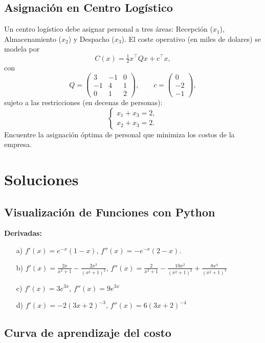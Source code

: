 \documentclass[12pt]{article}
\begin{document}
\subsection{Asignación en Centro Logístico}

Un centro logístico debe asignar personal a tres áreas: Recepción (\(x_1\)), Almacenamiento (\(x_2\)) y Despacho (\(x_3\)). El coste operativo (en miles de dolares) se modela por
\[
C(x)=\tfrac12 x^\top Q x + c^\top x,
\]
con
\[
Q=\begin{pmatrix}3&-1&0\\[4pt]-1&4&1\\[4pt]0&1&2\end{pmatrix},\qquad
c=\begin{pmatrix}0\\[4pt]-2\\[4pt]-1\end{pmatrix},
\]
sujeto a las restricciones (en decenas de personas):
\[
\begin{cases}
x_1+x_3=2,\\[4pt]
x_2+x_3=2.
\end{cases}
\]
Encuentre la asignación óptima de personal que minimiza los costos de la empresa.

\newpage

\section{Soluciones}

\subsection{Visualización de Funciones con Python}

\textbf{Derivadas:}
\begin{itemize}
    \item[a)] $f'(x) = e^{-x} (1-x)$, $f''(x) = -e^{-x} (2-x)$. 
    \item[b)] $f'(x) = \frac{2 x}{x^2+1}-\frac{2 x^3}{\left(x^2+1\right)^2}$, $f''(x) = \frac{2}{x^2 +1} - \frac{10x^2}{(x^2+1)^2} + \frac{8x^4}{(x^2 + 1)^3}$
    \item[c)] $f'(x) = 3e^{3x}$, $f''(x) = 9e^{3x}$
    \item[d)] $f'(x) = -2(3x+2)^{-3}$, $f''(x) = 6(3x+2)^{-4}$
\end{itemize}

\subsection{Curva de aprendizaje del costo}
\end{document}
